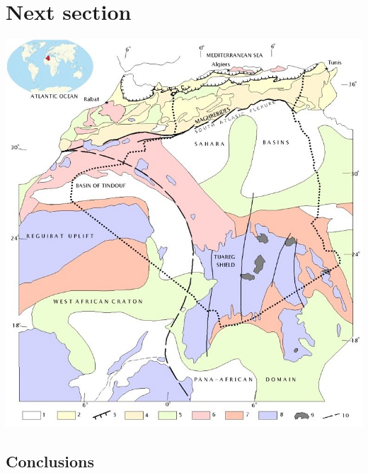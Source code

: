 \documentclass[a0,portrait]{a0poster}
\begin{document}
\begin{multicols}{3}
\section{Next section}
\blindtext

\begin{center}\vspace{1cm}
    \includegraphics[width=0.8\linewidth]{Figure_1}
\end{center}\vspace{1cm}


\vspace{2cm}
\begin{tcolorbox}[width=0.95\linewidth,colback={conclusion},frame empty,boxsep=1cm]
\section{Conclusions}
\blindtext
\end{tcolorbox}    


\end{multicols}
\end{document}
